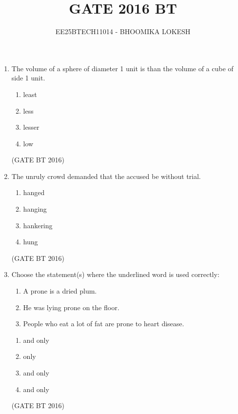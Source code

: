 \documentclass[journal,12pt,onecolumn]{IEEEtran}
\theoremstyle{remark}
\begin{document}
\title{GATE 2016 BT}
\author{EE25BTECH11014 - BHOOMIKA LOKESH}
\maketitle

\renewcommand{\thefigure}{\theenumi}
\renewcommand{\thetable}{\theenumi}
\begin{enumerate}


\section{Q.1-Q.5 carry one mark each}
\item The volume of a sphere of diameter 1 unit is 	  than the volume of a cube of side 1 unit.
    \begin{multicols}{4}
    \begin{enumerate}
    \item least	
    \item less
    \item lesser 
    \item low    
\end{enumerate}
\end{multicols} \hfill(GATE BT 2016)  

\item The unruly crowd demanded that the accused be 	 without trial.
  \begin{multicols}{4}
    \begin{enumerate}
    \item hanged	
    \item hanging
    \item hankering	
    \item hung
\end{enumerate}
\end{multicols} \hfill(GATE BT 2016)   

\item Choose the statement(s) where the underlined word is used correctly:
  \begin{enumerate}[label=\roman*.]
\item A prone is a dried plum.
\item He was lying prone on the floor.
\item  People who eat a lot of fat are prone to heart disease.
   \end{enumerate}
    \begin{multicols}{2}
    \begin{enumerate}
\item {} and  only	
\item {} only	
\item {} and  only	
\item {}and  only
     \end{enumerate}
     \end{multicols} \hfill(GATE BT 2016)   


\end{enumerate}
\end{document}
